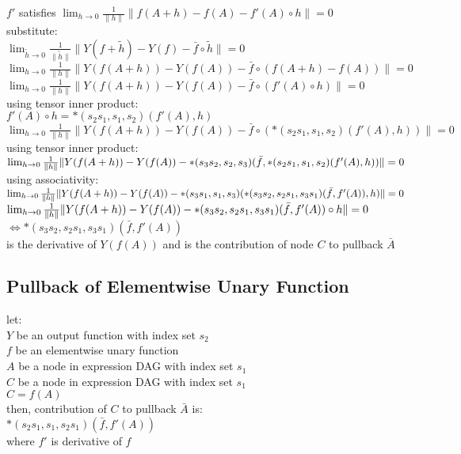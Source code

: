 \documentclass[8pt]{extarticle}
\begin{document}
\begin{multicols*}{2}
  $f'$ satisfies $\lim_{h \rightarrow 0} \frac{1}{\| h \|} \| f(A+h) - f(A) - f'(A) \circ h \| = 0$\\

  substitute:\\
  $\lim_{\tilde{h} \rightarrow 0} \frac{1}{\| \tilde{h} \|} \|Y(f+\tilde{h}) - Y(f) - \bar{f} \circ \tilde{h} \| = 0$\\
  $\lim_{h \rightarrow 0} \frac{1}{\| h \|} \|Y(f(A+h)) - Y(f(A)) - \bar{f} \circ (f(A+h) - f(A))\| = 0$\\
  $\lim_{h \rightarrow 0} \frac{1}{\| h \|} \|Y(f(A+h)) - Y(f(A)) - \bar{f} \circ (f'(A) \circ h)\| = 0$\\

  using tensor inner product:\\
  $f'(A) \circ h = *(s_2 s_1, s_1, s_2)(f'(A), h)$\\
  $\lim_{h \rightarrow 0} \frac{1}{\| h \|} \|Y(f(A+h)) - Y(f(A)) - \bar{f} \circ (*(s_2 s_1, s_1, s_2)(f'(A), h))\| = 0$\\

  using tensor inner product:\\
  $\lim_{h \rightarrow 0} \frac{1}{\| h \|} \|Y(f(A+h)) - Y(f(A)) \\ - *(s_3 s_2, s_2, s_3)(\bar{f}, *(s_2 s_1, s_1, s_2)(f'(A), h))\| = 0$\\

  using associativity:\\
  $\lim_{h \rightarrow 0} \frac{1}{\| h \|} \|Y(f(A+h)) - Y(f(A)) \\ - *(s_3 s_1, s_1, s_3)(*(s_3 s_2, s_2 s_1, s_3 s_1)(\bar{f}, f'(A)), h) \| = 0$\\
  
  $\lim_{h \rightarrow 0} \frac{1}{\| h \|} \|Y(f(A+h)) - Y(f(A)) \\ - *(s_3 s_2, s_2 s_1, s_3 s_1)(\bar{f}, f'(A)) \circ h \| = 0$\\
  $\iff *(s_3 s_2, s_2 s_1, s_3 s_1)(\bar{f}, f'(A))$\\
  is the derivative of $Y(f(A))$ and is the contribution of node $C$ to pullback $\bar{A}$
  
  \vfill\null
  \columnbreak
    
  \subsection{Pullback of Elementwise Unary Function}
  let:\\
  $Y$ be an output function with index set $s_2$\\
  $f$ be an elementwise unary function\\
  $A$ be a node in expression DAG with index set $s_1$\\
  $C$ be a node in expression DAG with index set $s_1$\\
  $C=f(A)$\\
  then, contribution of $C$ to pullback $\bar{A}$ is:\\
  $*(s_2 s_1, s_1, s_2 s_1)(\bar{f}, f'(A))$\\
  where $f'$ is derivative of $f$
  

\end{multicols*}
\end{document}
